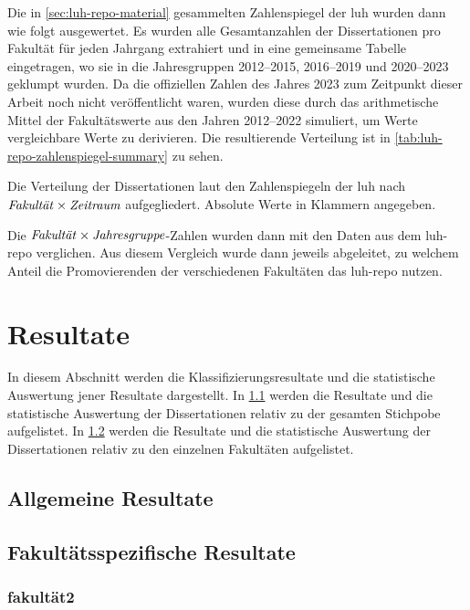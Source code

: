 Die in \cref{sec:luh-repo-material} gesammelten Zahlenspiegel der \gls{luh} wurden dann wie folgt ausgewertet.
Es wurden alle Gesamtanzahlen der Dissertationen pro Fakultät für jeden Jahrgang extrahiert und in eine gemeinsame Tabelle eingetragen, wo sie in die Jahresgruppen 2012--2015, 2016--2019 und 2020--2023 geklumpt wurden.
Da die offiziellen Zahlen des Jahres 2023 zum Zeitpunkt dieser Arbeit noch nicht veröffentlicht waren, wurden diese durch das arithmetische Mittel der Fakultätswerte aus den Jahren 2012--2022 simuliert, um Werte vergleichbare Werte zu derivieren.
Die resultierende Verteilung ist in \cref{tab:luh-repo-zahlenspiegel-summary} zu sehen.
\begin{table}[!htbp]
	\caption{Die Verteilung der Dissertationen laut den Zahlenspiegeln der \gls{luh} nach $\text{\textit{Fakultät}}\times\text{\textit{Zeitraum}}$ aufgegliedert.
    Absolute Werte in Klammern angegeben.}
    
	\label{tab:luh-repo-zahlenspiegel-summary}
\end{table}
Die $\text{\textit{Fakultät}}\times\text{\textit{Jahresgruppe}}$-Zahlen wurden dann mit den Daten aus dem \gls{luh-repo} verglichen.
Aus diesem Vergleich wurde dann jeweils abgeleitet, zu welchem Anteil die Promovierenden der verschiedenen Fakultäten das \gls{luh-repo} nutzen.

\section{Resultate}\label{sec:luh-repo-results}
In diesem Abschnitt werden die Klassifizierungsresultate und die statistische Auswertung jener Resultate dargestellt.
In \cref{sec:luh-repo-results-general} werden die Resultate und die statistische Auswertung der Dissertationen relativ zu der gesamten Stichpobe aufgelistet.
In \cref{sec:luh-repo-results-specific} werden die Resultate und die statistische Auswertung der Dissertationen relativ zu den einzelnen Fakultäten aufgelistet.

\subsection{Allgemeine Resultate}\label{sec:luh-repo-results-general}
\subsection{Fakultätsspezifische Resultate}\label{sec:luh-repo-results-specific}
\subsubsection{\gls{fakultät2}}
